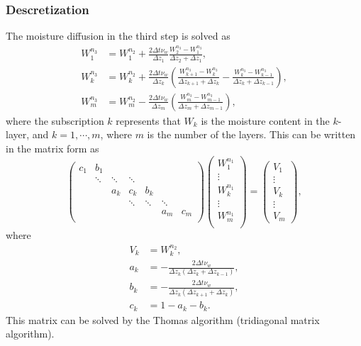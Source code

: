 \subsubsection{Descretization}
The moisture diffusion in the third step is solved as
\begin{align}
 W_1^{n_3} &= W_1^{n_2} + \frac{2\Delta t \nu_w }{\Delta z_1}\frac{W_2^{n_3} - W_1^{n_3}}{\Delta z_2 + \Delta z_1}, \\
 W_k^{n_3} &= W_k^{n_2} + \frac{2\Delta t \nu_w }{\Delta z_k}\left( \frac{W_{k+1}^{n_3} - W_k^{n_3}}{\Delta z_{k+1}+\Delta z_k}  - \frac{W_k^{n_3} - W_{k-1}^{n_3}}{\Delta z_k+\Delta z_{k-1}} \right), \\
 W_m^{n_3} &= W_m^{n_2} - \frac{2\Delta t \nu_w }{\Delta z_m}\left( \frac{W_m^{n_3} - W_{m-1}^{n_3}}{\Delta z_m+\Delta z_{m-1}} \right),
\end{align}
where the subscription $k$ represents that $W_k$ is the moisture content in the $k$-layer, and $k = 1, \cdots, m$, where $m$ is the number of the layers.
This can be written in the matrix form as
\begin{equation}
\begin{pmatrix}
  c_1  & b_1    &        &        &        &         &         \\
       & \ddots & \ddots & \ddots &        &         &         \\
       &        & a_k    & c_k    & b_k    &         &         \\
       &        &        & \ddots & \ddots & \ddots  &         \\
       &        &        &        &        & a_m     & c_m     \\
\end{pmatrix}
\begin{pmatrix}
  W_1^{n_1}   \\
  \vdots      \\
  W_k^{n_1}   \\
  \vdots      \\
  W_m^{n_1}   \\
\end{pmatrix}
=
\begin{pmatrix}
  V_1 \\
  \vdots        \\
  V_k \\
  \vdots        \\
  V_m
\end{pmatrix}
,
\end{equation}
where
\begin{align}
 V_k &= W_k^{n_2}, \\
 a_k &= - \frac{2\Delta t\nu_w}{\Delta z_k (\Delta z_k + \Delta z_{k-1})}, \\
 b_k &= - \frac{2\Delta t\nu_w}{\Delta z_k (\Delta z_{k+1} + \Delta z_k)}, \\
 c_k &= 1 - a_k - b_k.
\end{align}
This matrix can be solved by the Thomas algorithm (tridiagonal matrix algorithm).





